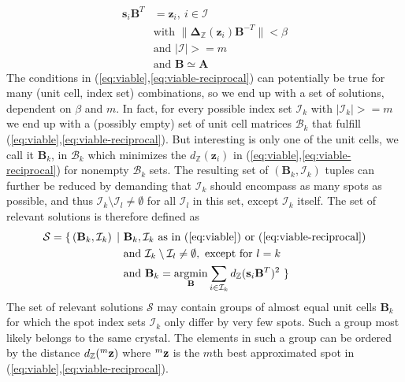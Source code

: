 \documentclass[a4paper,10pt]{article}
\DeclareMathOperator*{\argmin}{argmin}
\newcommand{\vect}[1]{\mathbf{#1}}
\newcommand{\mat}[1]{\mathbf{#1}}
\newcommand{\distZ}[1]{d_\mathbb{Z}(#1)}
\newcommand{\diffvecZ}[1]{\vect{\Delta}_\mathbb{Z}(#1)}
\begin{document}
%
\begin{equation}\label{eq:viable-reciprocal}
 \begin{split}
  \vect{s}_i \mat{B}^T &= \vect{z}_i,\ i \in \mathcal{I} \\
  &\text{with }\|\diffvecZ{\vect{z}_i}\mat{B}^{-T}\| < \beta \\
  &\text{and }|\mathcal{I}| >= m \\
  &\text{and }\mat{B} \simeq \mat{A}
 \end{split}
\end{equation}
%
The conditions in (\ref{eq:viable},\ref{eq:viable-reciprocal}) can potentially be true for many (unit cell, index set) combinations, so we end up with a set of solutions, dependent on $\beta$ and $m$. In fact, for every possible index set $\mathcal{I}_k$ with $|\mathcal{I}_k| >= m$ we end up with a (possibly empty) set of unit cell matrices $\mathcal{B}_k$ that fulfill (\ref{eq:viable},\ref{eq:viable-reciprocal}). But interesting is only one of the unit cells, we call it $\mat{B}_k$, in $\mathcal{B}_k$ which minimizes the $\distZ{\vect{z}_i}$ in (\ref{eq:viable},\ref{eq:viable-reciprocal}) for nonempty $\mathcal{B}_k$ sets. The resulting set of $(\mat{B}_k, \mathcal{I}_k)$ tuples can further be reduced by demanding that $\mathcal{I}_k$ should encompass as many spots as possible, and thus $\mathcal{I}_k \setminus \mathcal{I}_l \neq \emptyset$ for all $\mathcal{I}_l$ in this set, except $\mathcal{I}_k$ itself. The set of relevant solutions is therefore defined as
%
\begin{equation}\label{eq:solution-set}
 \begin{split}
  \mathcal{S} = \{\, (\mat{B}_k, \mathcal{I}_k)\,\mid\ &\mat{B}_k, \mathcal{I}_k\text{ as in (\ref{eq:viable}) or (\ref{eq:viable-reciprocal})} \\
  &\text{and }\mathcal{I}_k \setminus \mathcal{I}_l \neq \emptyset,\text{ except for }l=k \\
  &\text{and }\mat{B}_k = \argmin_{\mat{B}} \sum_{i \in \mathcal{I}_k} \distZ{\vect{s}_i \mat{B}^T}^2\ \}
 \end{split}
\end{equation}
%
The set of relevant solutions $\mathcal{S}$ may contain groups of almost equal unit cells $\mat{B}_k$ for which the spot index sets $\mathcal{I}_k$ only differ by very few spots. Such a group most likely belongs to the same crystal. The elements in such a group can be ordered by the distance $\distZ{\prescript{m}{}{\vect{z}}}$ where $\prescript{m}{}{\vect{z}}$ is the $m$th best approximated spot in (\ref{eq:viable},\ref{eq:viable-reciprocal}).
\end{document}
